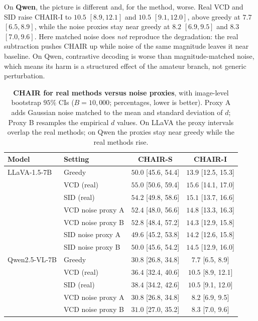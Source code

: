 On \textbf{Qwen}, the picture is different and, for the method, worse. Real VCD
and SID raise CHAIR-I to $10.5$ $[8.9, 12.1]$ and $10.5$ $[9.1, 12.0]$, above
greedy at $7.7$ $[6.5, 8.9]$, while the noise proxies stay near greedy at $8.2$
$[6.9, 9.5]$ and $8.3$ $[7.0, 9.6]$. Here matched noise does \emph{not} reproduce
the degradation: the real subtraction pushes CHAIR up while noise of the same
magnitude leaves it near baseline. On Qwen, contrastive decoding is worse than
magnitude-matched noise, which means its harm is a structured effect of the
amateur branch, not generic perturbation.

\begin{table}[t]
\centering
\small
\setlength{\tabcolsep}{5pt}
\caption{\textbf{CHAIR for real methods versus noise proxies}, with image-level
bootstrap $95\%$ CIs ($B=10{,}000$; percentages, lower is better). Proxy A adds
Gaussian noise matched to the mean and standard deviation of $d$; Proxy B
resamples the empirical $d$ values. On LLaVA the proxy intervals overlap the real
methods; on Qwen the proxies stay near greedy while the real methods rise.}
\label{tab:dproxy-chair}
\begin{tabular}{llcc}
\toprule
Model & Setting & CHAIR-S & CHAIR-I \\
\midrule
LLaVA-1.5-7B & Greedy & $50.0$ \tiny{[45.6, 54.4]} & $13.9$ \tiny{[12.5, 15.3]} \\
 & VCD (real) & $55.0$ \tiny{[50.6, 59.4]} & $15.6$ \tiny{[14.1, 17.0]} \\
 & SID (real) & $54.2$ \tiny{[49.8, 58.6]} & $15.1$ \tiny{[13.7, 16.6]} \\
 & VCD noise proxy A & $52.4$ \tiny{[48.0, 56.6]} & $14.8$ \tiny{[13.3, 16.3]} \\
 & VCD noise proxy B & $52.8$ \tiny{[48.4, 57.2]} & $14.3$ \tiny{[12.9, 15.8]} \\
 & SID noise proxy A & $49.6$ \tiny{[45.2, 53.8]} & $14.2$ \tiny{[12.6, 15.8]} \\
 & SID noise proxy B & $50.0$ \tiny{[45.6, 54.2]} & $14.5$ \tiny{[12.9, 16.0]} \\
\midrule
Qwen2.5-VL-7B & Greedy & $30.8$ \tiny{[26.8, 34.8]} & $7.7$ \tiny{[6.5, 8.9]} \\
 & VCD (real) & $36.4$ \tiny{[32.4, 40.6]} & $10.5$ \tiny{[8.9, 12.1]} \\
 & SID (real) & $38.4$ \tiny{[34.2, 42.6]} & $10.5$ \tiny{[9.1, 12.0]} \\
 & VCD noise proxy A & $30.8$ \tiny{[26.8, 34.8]} & $8.2$ \tiny{[6.9, 9.5]} \\
 & VCD noise proxy B & $31.0$ \tiny{[27.0, 35.2]} & $8.3$ \tiny{[7.0, 9.6]} \\
\bottomrule
\end{tabular}
\end{table}

